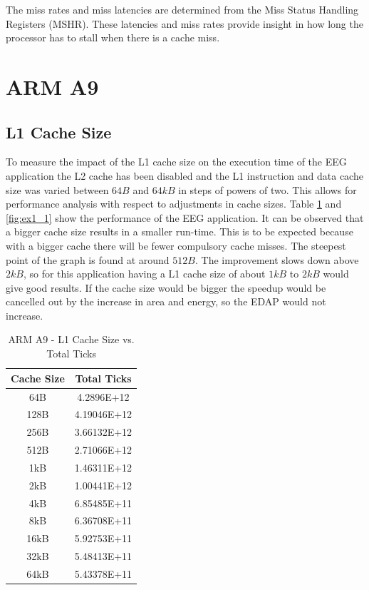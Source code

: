 \documentclass[a4paper, 10pt, conference]{ieeeconf}      %
\begin{document}
The miss rates and miss latencies are determined from the Miss Status Handling Registers (MSHR). These latencies and miss rates provide insight in how long the processor has to stall when there is a cache miss.

%

\section{ARM A9}

\subsection{L1 Cache Size}

To measure the impact of the L1 cache size on the execution time of the EEG application the L2 cache has been disabled and the L1 instruction and data cache size was varied between $64B$ and $64kB$ in steps of powers of two. This allows for performance analysis with respect to adjustments in cache sizes. Table \ref{tab:A9_L1} and \ref{fig:ex1_1} show the performance of the EEG application. It can be observed that a bigger cache size results in a smaller run-time. This is to be expected because with a bigger cache there will be fewer compulsory cache misses. The steepest point of the graph is found at around $512B$. The improvement slows down above $2kB$, so for this application having a L1 cache size of about $1kB$ to $2kB$ would give good results. If the cache size would be bigger the speedup would be cancelled out by the increase in area and energy, so the EDAP would not increase.

\begin{table}[h]
\caption{ARM A9 - L1 Cache Size vs. Total Ticks}
\label{tab:A9_L1}
\begin{center}
\begin{tabular}{|c||c|}
\hline
Cache Size & Total Ticks\\
\hline
64B & 4.2896E+12\\
\hline
128B & 4.19046E+12\\
\hline
256B & 3.66132E+12\\
\hline
512B & 2.71066E+12\\
\hline
1kB & 1.46311E+12\\
\hline
2kB & 1.00441E+12\\
\hline
4kB & 6.85485E+11\\
\hline
8kB & 6.36708E+11\\
\hline
16kB & 5.92753E+11\\
\hline
32kB & 5.48413E+11\\
\hline
64kB & 5.43378E+11\\
\hline

\end{tabular}
\end{center}
\end{table}
\end{document}
